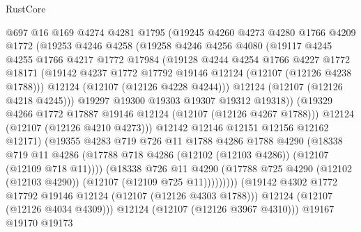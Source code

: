\begin{lexlean}{RustCore}
\begin{coremodule}
                  @697
                  @16
                  @169
                  @4274
                  @4281
                  @1795
                  (@19245
                    @4260
                    @4273
                    @4280
                    @1766
                    @4209
                    @1772
                    (@19253
                      @4246
                      @4258
                      (@19258
                        @4246
                        @4256
                        @4080
                        (@19117
                          @4245
                          @4255
                          @1766
                          @4217
                          @1772
                          @17984
                          (@19128
                            @4244
                            @4254
                            @1766
                            @4227
                            @1772
                            @18171
                            (@19142 @4237 @1772 @17792 @19146 @12124 (@12107 (@12126 @4238 @1788)))
                            @12124
                            (@12107 (@12126 @4228 @4244)))
                          @12124
                          (@12107 (@12126 @4218 @4245)))
                        @19297
                        @19300
                        @19303
                        @19307
                        @19312
                        @19318))
                    (@19329 @4266 @1772 @17887 @19146 @12124 (@12107 (@12126 @4267 @1788)))
                    @12124
                    (@12107 (@12126 @4210 @4273)))
                  @12142
                  @12146
                  @12151
                  @12156
                  @12162
                  @12171)
                (@19355
                  @4283
                  @719
                  @726
                  @11
                  @1788
                  @4286
                  @1788
                  @4290
                  (@18338
                    @719
                    @11
                    @4286
                    (@17788 @718 @4286 (@12102 (@12103 @4286)) (@12107 (@12109 @718 @11))))
                  (@18338
                    @726
                    @11
                    @4290
                    (@17788 @725 @4290 (@12102 (@12103 @4290)) (@12107 (@12109 @725 @11)))))))))
        (@19142 @4302 @1772 @17792 @19146 @12124 (@12107 (@12126 @4303 @1788)))
        @12124
        (@12107 (@12126 @4034 @4309)))
      @12124
      (@12107 (@12126 @3967 @4310)))
    @19167
    @19170
    @19173

\end{coremodule}
\end{lexlean}
